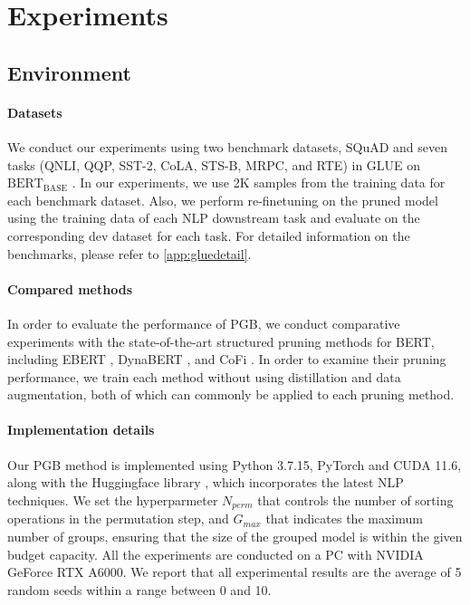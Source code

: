
\section{Experiments}
\subsection{Environment}
\paragraph{Datasets} 



We conduct our experiments using two benchmark datasets, $\text{SQuAD}$ \cite{SQuAD,SQuAD2} and seven tasks (QNLI, QQP, SST-2, CoLA, STS-B, MRPC, and RTE) in GLUE \cite{GLUE} on $\text{BERT}_{\text{BASE}}$ \cite{BERT}.
In our experiments, we use 2K samples from the training data for each benchmark dataset. Also, we perform re-finetuning on the pruned model using the training data of each NLP downstream task and evaluate on the corresponding dev dataset for each task. For detailed information on the benchmarks, please refer to \ref{app:gluedetail}. 

\paragraph{Compared methods}
In order to evaluate the performance of PGB, we conduct comparative experiments with the state-of-the-art structured pruning methods for BERT, including EBERT \cite{ebert}, DynaBERT \cite{DynaBERT}, and CoFi \cite{Xia}. In order to examine their pruning performance, we train each method without using distillation and data augmentation, both of which can commonly be applied to each pruning method.


\paragraph{Implementation details} 
Our PGB method is implemented using Python 3.7.15, PyTorch \cite{Pytorch} and CUDA 11.6, along with the Huggingface library \cite{Wolf}, which incorporates the latest NLP techniques. We set the hyperparmeter $N_{perm}$ that controls the number of sorting operations in the permutation step, and $G_{max}$ that indicates the maximum number of groups, ensuring that the size of the grouped model is within the given budget capacity. All the experiments are conducted on a PC with NVIDIA GeForce RTX A6000. We report that all experimental results are the average of 5 random seeds within a range between 0 and 10.

